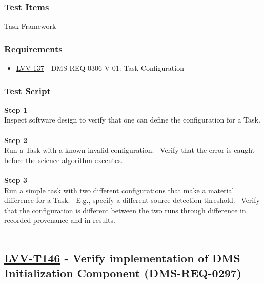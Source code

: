 \hypertarget{test-items-121}{%
\subsubsection{Test Items}\label{test-items-121}}

Task Framework~

\hypertarget{requirements-122}{%
\subsubsection{Requirements}\label{requirements-122}}

\begin{itemize}
\tightlist
\item
  \href{https://jira.lsstcorp.org/browse/LVV-137}{LVV-137} -
  DMS-REQ-0306-V-01: Task Configuration
\end{itemize}

\hypertarget{test-script-122}{%
\subsubsection{Test Script}\label{test-script-122}}

\textbf{Step 1}\\
Inspect software design to verify that one can define the configuration
for a Task.\\
~\\
\textbf{Step 2}\\
Run a Task with a known invalid configuration. ~Verify that the error is
caught before the science algorithm executes.\\
~\\
\textbf{Step 3}\\
Run a simple task with two different configurations that make a material
difference for a Task. ~E.g., specify a different source detection
threshold. ~Verify that the configuration is different between the two
runs through difference in recorded provenance and in results.\\
~\\

\hypertarget{lvv-t146---verify-implementation-of-dms-initialization-component-dms-req-0297}{%
\subsection{\texorpdfstring{\href{https://jira.lsstcorp.org/secure/Tests.jspa\#/testCase/LVV-T146}{LVV-T146}
- Verify implementation of DMS Initialization Component
(DMS-REQ-0297)}{LVV-T146 - Verify implementation of DMS Initialization Component (DMS-REQ-0297)}}\label{lvv-t146---verify-implementation-of-dms-initialization-component-dms-req-0297}}


